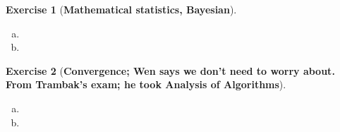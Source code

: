 \documentclass{article}
\theoremstyle{definition}
\newtheorem{exercise}{Exercise}
\theoremstyle{definition}
\theoremstyle{definition}
\theoremstyle{definition}
\begin{document}
\begin{exercise}[\textbf{Mathematical statistics, Bayesian}]

\begin{enumerate}[(a)]

\item

\item

\end{enumerate}

\end{exercise}

\begin{exercise}[\textbf{Convergence; Wen says we don't need to worry about. From Trambak's exam; he took Analysis of Algorithms}]

\begin{enumerate}[(a)]

\item

\item

\end{enumerate}

\end{exercise}
\end{document}
